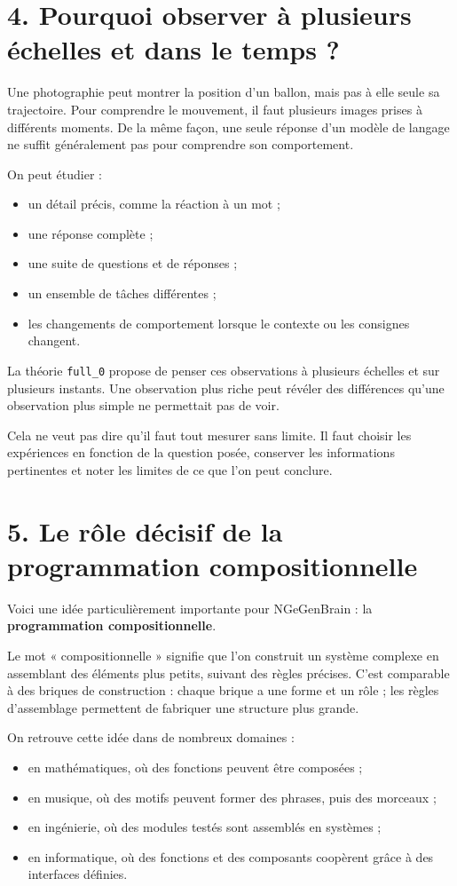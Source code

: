 \documentclass[11pt,a4paper]{article}
\begin{document}
\section*{4. Pourquoi observer à plusieurs échelles et dans le temps ?}

Une photographie peut montrer la position d'un ballon, mais pas à elle seule sa trajectoire. Pour comprendre le mouvement, il faut plusieurs images prises à différents moments. De la même façon, une seule réponse d'un modèle de langage ne suffit généralement pas pour comprendre son comportement.

On peut étudier :
\begin{itemize}[leftmargin=1.4em]
  \item un détail précis, comme la réaction à un mot ;
  \item une réponse complète ;
  \item une suite de questions et de réponses ;
  \item un ensemble de tâches différentes ;
  \item les changements de comportement lorsque le contexte ou les consignes changent.
\end{itemize}

La théorie \texttt{full\_0} propose de penser ces observations à plusieurs échelles et sur plusieurs instants. Une observation plus riche peut révéler des différences qu'une observation plus simple ne permettait pas de voir.

Cela ne veut pas dire qu'il faut tout mesurer sans limite. Il faut choisir les expériences en fonction de la question posée, conserver les informations pertinentes et noter les limites de ce que l'on peut conclure.

\section*{5. Le rôle décisif de la programmation compositionnelle}

Voici une idée particulièrement importante pour NGeGenBrain : la \textbf{programmation compositionnelle}.

Le mot « compositionnelle » signifie que l'on construit un système complexe en assemblant des éléments plus petits, suivant des règles précises. C'est comparable à des briques de construction : chaque brique a une forme et un rôle ; les règles d'assemblage permettent de fabriquer une structure plus grande.

On retrouve cette idée dans de nombreux domaines :
\begin{itemize}[leftmargin=1.4em]
  \item en mathématiques, où des fonctions peuvent être composées ;
  \item en musique, où des motifs peuvent former des phrases, puis des morceaux ;
  \item en ingénierie, où des modules testés sont assemblés en systèmes ;
  \item en informatique, où des fonctions et des composants coopèrent grâce à des interfaces définies.
\end{itemize}
\end{document}
